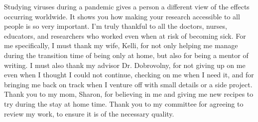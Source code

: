 Studying viruses during a pandemic gives a person a different view of the effects occurring worldwide. It shows you how making your research accessible to all people is so very important. I'm truly thankful to all the doctors, nurses, educators, and researchers who worked even when at risk of becoming sick. For me specifically, I must thank my wife, Kelli, for not only helping me manage during the transition time of being only at home, but also for being a mentor of writing. I must also thank my advisor Dr. Dobrovolny, for not giving up on me even when I thought I could not continue, checking on me when I need it, and for bringing me back on track when I venture off with small details or a side project. Thank you to my mom, Sharon, for believing in me and giving me new recipes to try during the stay at home time. Thank you to my committee for agreeing to review my work, to ensure it is of the necessary quality.
